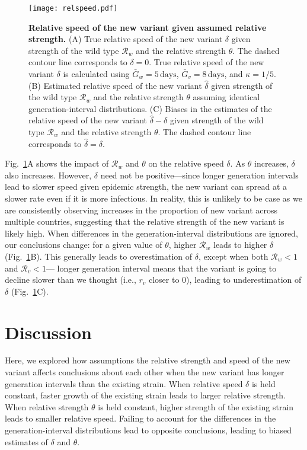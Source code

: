 \documentclass[12pt]{article}
\newcommand{\fref}[1]{Fig.~\ref{fig:#1}}
\newcommand{\RR}{\ensuremath{{\mathcal R}}\xspace}
\begin{document}
\begin{figure}[!th]
\texttt{[image: relspeed.pdf]}
\caption{
\textbf{Relative speed of the new variant given assumed relative strength.}
(A) True relative speed of the new variant $\delta$ given strength of the wild type $\RR_w$ and the relative strength $\theta$.
The dashed contour line corresponds to $\delta = 0$.
True relative speed of the new variant $\delta$ is calculated using $\bar{G}_w = 5\,\textrm{days}$, $\bar{G}_v = 8\,\textrm{days}$, and $\kappa = 1/5$. 
(B) Estimated relative speed of the new variant $\hat{\delta}$ given strength of the wild type $\RR_w$ and the relative strength $\theta$ assuming identical generation-interval distributions.
(C) Biases in the estimates of the relative speed of the new variant $\hat{\delta} - \delta$ given strength of the wild type $\RR_w$ and the relative strength $\theta$.
The dashed contour line corresponds to $\hat{\delta} = \delta$.
}
\label{fig:relspeed}
\end{figure}

\fref{relspeed}A shows the impact of $\RR_w$ and $\theta$ on the relative speed $\delta$.
As $\theta$ increases, $\delta$ also increases.
However, $\delta$ need not be positive---since longer generation intervals lead to slower speed given epidemic strength, the new variant can spread at a slower rate even if it is more infectious.
In reality, this is unlikely to be case as we are consistently observing increases in the proportion of new variant across multiple countries, suggesting that the relative strength of the new variant is likely high.
When differences in the generation-interval distributions are ignored, our conclusions change: for a given value of $\theta$, higher $\RR_w$ leads to higher $\delta$ (\fref{relspeed}B).
This generally leads to overestimation of $\delta$, except when both $\RR_w < 1$ and $\RR_v < 1$---
longer generation interval means that the variant is going to decline slower than we thought (i.e., $r_v$ closer to 0), leading to underestimation of $\delta$ (\fref{relspeed}C).

\section{Discussion}

Here, we explored how assumptions the relative strength and speed of the new variant affects conclusions about each other when the new variant has longer generation intervals than the existing strain.
When relative speed $\delta$ is held constant, faster growth of the existing strain leads to larger relative strength.
When relative strength $\theta$ is held constant, higher strength of the existing strain leads to smaller relative speed.
Failing to account for the differences in the generation-interval distributions lead to opposite conclusions, leading to biased estimates of $\delta$ and $\theta$.
\end{document}
